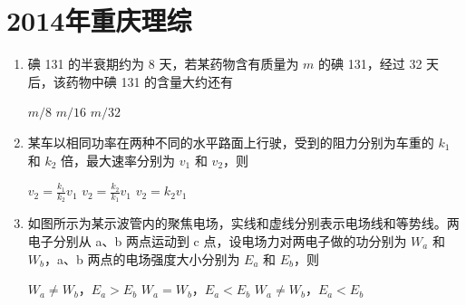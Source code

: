 \documentclass[\gkver]{gaokaozhenti}
\begin{document}
\chapter{2014年重庆理综}

\begin{enumerate}
\item
碘 131 的半衰期约为 8 天，若某药物含有质量为 $m$ 的碘 131，经过 32 天后，该药物中碘 131 的含量大约还有

{$m/8$}
{$m/16$}
{$m/32$}


\item
某车以相同功率在两种不同的水平路面上行驶，受到的阻力分别为车重的 $k_{1}$ 和 $k_{2}$ 倍，最大速率分别为 $v_{1}$ 和 $v_{2}$，则

{$v_{2}=\frac{k_{1}}{k_{2}}v_{1}$}
{$v_{2}=\frac{k_{2}}{k_{1}}v_{1}$}
{$v_{2}=k_{2}v_{1}$}


\item
如图所示为某示波管内的聚焦电场，实线和虚线分别表示电场线和等势线。两电子分别从 a、b 两点运动到 c 点，设电场力对两电子做的功分别为 $W_{a}$ 和 $W_{b}$，a、b 两点的电场强度大小分别为 $E_{a}$ 和 $E_{b}$，则


{$W_{a}\neq W_{b}$，$E_{a}>E_{b}$}
{$W_{a}=W_{b}$，$E_{a}<E_{b}$}
{$W_{a}\neq W_{b}$，$E_{a}<E_{b}$}


\end{enumerate}
\end{document}

